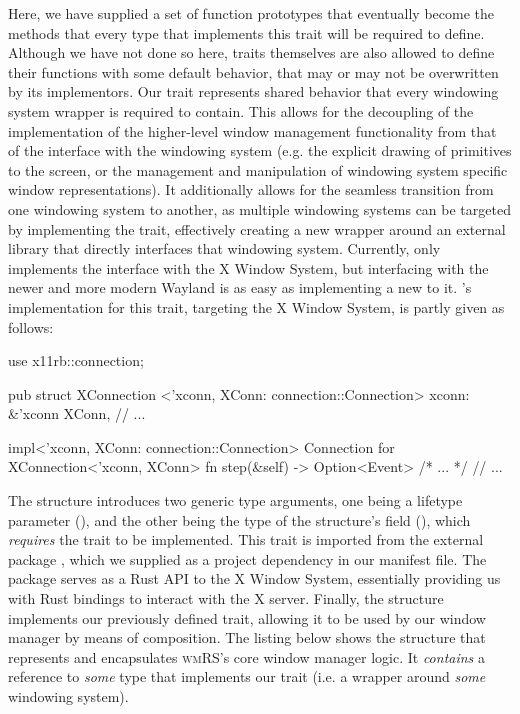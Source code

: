 Here, we have supplied a set of function prototypes that eventually become
the methods that every type that implements this trait will be required to
define. Although we have not done so here, traits themselves are also allowed
to define their functions with some default behavior, that may or may not
be overwritten by its implementors\cite{therustbook, rusttraitsdeepdive}.
Our  trait represents shared behavior that every windowing
system wrapper is required to contain. This allows for the decoupling of the
implementation of the higher-level window management functionality from that of
the interface with the windowing system (e.g. the explicit drawing of primitives
to the screen, or the management and manipulation of windowing system specific
window representations). It additionally allows for the seamless transition from
one windowing system to another, as multiple windowing systems can be targeted
by implementing the trait, effectively creating a new wrapper around an external
library that directly interfaces that windowing system. Currently, \wmrs only
implements the interface with the X Window System, but interfacing with the
newer and more modern Wayland\cite{wayland} is as easy as implementing a new
 to it. \wmrs's implementation for this trait, targeting the X
Window System, is partly given as follows:

\begin{rustblock}
  use x11rb::connection;
\end{rustblock}
\begin{rustblock}
  pub struct XConnection
    <'xconn, XConn: connection::Connection>
  {
    xconn: &'xconn XConn,
    // ...
  }
\end{rustblock}
\begin{rustblock}
  impl<'xconn, XConn: connection::Connection>
    Connection for XConnection<'xconn, XConn>
  {
    fn step(&self) -> Option<Event> { /* ... */ }
    // ...
  }
\end{rustblock}

The  structure introduces two generic type arguments,
one being a lifetype parameter (), and the other being
the type of the structure's  field (), which
\textit{requires} the  trait to be implemented.
This  trait is imported from the external package
, which we supplied as a project dependency in our manifest file. The
 package serves as a Rust API to the X Window System, essentially
providing us with Rust bindings to interact with the X server. Finally, the
 structure implements our previously defined 
trait, allowing it to be used by our window manager by means of composition.
The listing below shows the structure that represents and encapsulates
\textsc{wmRS}'s core window manager logic. It \textit{contains} a reference to
\textit{some} type that implements our  trait (i.e. a wrapper
around \textit{some} windowing system).

